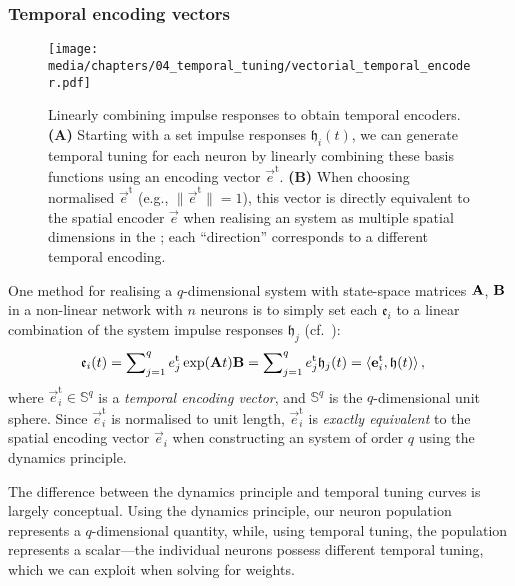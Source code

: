 \subsubsection{Temporal encoding vectors}

\begin{figure}
	\texttt{[image: media/chapters/04\_temporal\_tuning/vectorial\_temporal\_encoder.pdf]}
	\caption[Linearly combining impulse responses to obtain temporal encoders]{Linearly combining impulse responses to obtain temporal encoders. \textbf{(A)} Starting with a set impulse responses $\mathfrak{h}_i(t)$, we can generate temporal tuning for each neuron by linearly combining these basis functions using an encoding vector $\vec{e}^\mathrm{t}$.
	\textbf{(B)} When choosing normalised $\vec{e}^\mathrm{t}$ (e.g., $\| \vec{e}^\mathrm{t} \| = 1$), this vector is directly equivalent to the spatial encoder $\vec e$ when realising an \LTI system as multiple spatial dimensions in the \NEF; each \enquote{direction} corresponds to a different temporal encoding.
	}
	\label{fig:vectorial_temporal_encoder}
\end{figure}

One method for realising a $q$-dimensional \LTI system with state-space matrices $\mathbf{A}$, $\mathbf{B}$ in a non-linear network with $n$ neurons is to simply set each $\mathfrak{e}_i$ to a linear combination of the system impulse responses $\mathfrak{h}_j$ (cf.~):
\begin{align}
	\mathfrak{e}_i(t) &= \sum\nolimits_{j = 1}^q {e}^\mathrm{t}_j \exp(\mathbf{A} t) \mathbf{B} = \sum\nolimits_{j = 1}^q {e}^\mathrm{t}_j \mathfrak{h}_j(t)  = \langle \mathbf{e}_i^\mathrm{t}, \mathbf{\mathfrak{h}}(t) \rangle \,,
	\label{eqn:temporal_encoding_vector}
\end{align}
where $\vec{e}_i^\mathrm{t} \in \mathbb{S}^q$ is a \emph{temporal encoding vector}, and $\mathbb{S}^q$ is the $q$-dimensional unit sphere.
Since $\vec{e}_i^\mathrm{t}$ is normalised to unit length, $\vec{e}_i^\mathrm{t}$ is \emph{exactly equivalent} to the spatial encoding vector $\vec e_i$ when constructing an \LTI system of order $q$ using the \NEF dynamics principle.

The difference between the dynamics principle and temporal tuning curves is largely conceptual.
Using the \NEF dynamics principle, our neuron population represents a $q$-dimensional quantity, while, using temporal tuning, the population represents a scalar---the individual neurons possess different temporal tuning, which we can exploit when solving for weights.

